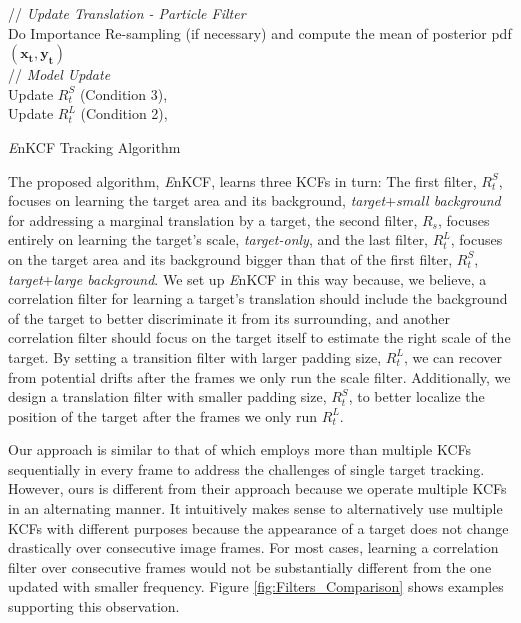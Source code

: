 \documentclass[10pt,twocolumn,letterpaper]{article}
\begin{document}
\begin{algorithm*}[h]
{	// \textit{Update Translation - Particle Filter}\\
	Do Importance Re-sampling (if necessary) and compute the 
	mean of posterior pdf $\mathbf{(x_{t},y_{t})}$\\
	// \textit{Model Update}\\
	Update $R_{t}^{S}$ (Condition 3),\\
	Update $R_{t}^{L}$ (Condition 2),\\
  \label{endfor}
}
\caption{{\it E}nKCF Tracking Algorithm}\label{alg:MKCF}
\end{algorithm*}

The proposed algorithm, {\it E}nKCF, learns three KCFs in turn: The
first filter, $R_{t}^{S}$, focuses on learning the target area and its
background, \textit{target}+\textit{small background} for addressing a
marginal translation by a target, the second filter, $R_{s}$, focuses
entirely on learning the target's scale, \textit{target-only}, and the
last filter, $R_{t}^{L}$, focuses on the target area and its
background bigger than that of the first filter, $R_{t}^{S}$,
\textit{target}+\textit{large background}. We set up {\it E}nKCF in
this way because, we believe, a correlation filter for learning a
target's translation should include the background of the target to
better discriminate it from its surrounding, and another correlation
filter should focus on the target itself to estimate the right scale
of the target. By setting a transition filter with larger padding
size, $R_{t}^{L}$, we can recover from potential drifts after the
frames we only run the scale filter. Additionally, we design a
translation filter with smaller padding size, $R_{t}^{S}$, to better
localize the position of the target after the frames we only run
$R_{t}^{L}$.

Our approach is similar to that of \cite{ma2015long} which employs more than
multiple KCFs sequentially in every frame to address the challenges of single target
tracking. However, ours is different from their approach because we operate multiple KCFs
in an alternating manner. It intuitively makes sense to alternatively use
multiple KCFs with different purposes because the appearance of a
target does not change drastically over consecutive image frames. For
most cases, learning a correlation filter over consecutive frames would not be substantially different
from the one updated with smaller frequency. Figure
\ref{fig:Filters_Comparison} shows examples supporting this
observation.
\end{document}
